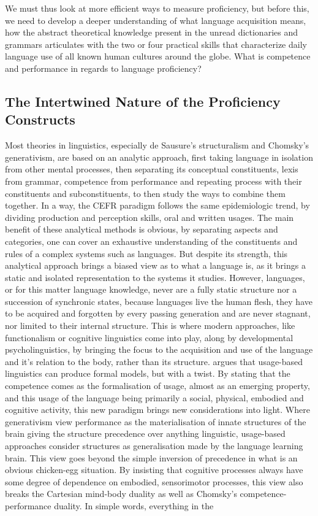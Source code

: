 We must thus look at more efficient ways to measure proficiency, but before this, we need to develop a deeper understanding of what language acquisition means, how the abstract theoretical knowledge present in the unread dictionaries and grammars articulates with the two or four practical skills that characterize daily language use of all known human cultures around the globe. What is competence and performance in regards to language proficiency?

    \subsection{The Intertwined Nature of the Proficiency Constructs}
Most theories in linguistics, especially de Sausure's structuralism and Chomsky's generativism, are based on an analytic approach, first taking language in isolation from other mental processes, then separating its conceptual constituents, lexis from grammar, competence from performance \parencite{chomsky_aspects_1965} and repeating process with their constituents and subconstituents, to then study the ways to combine them together. In a way, the CEFR paradigm follows the same epidemiologic trend, by dividing production and perception skills, oral and written usages. The main benefit of these analytical methods is obvious, by separating aspects and categories, one can cover an exhaustive understanding of the constituents and rules of a complex systems such as languages. But despite its strength, this analytical approach brings a biased view as to what a language is, as it brings a static and isolated representation to the systems it studies. However, languages, or for this matter language knowledge, never are a fully static structure nor a succession of synchronic states, because languages live the human flesh, they have to be acquired and forgotten by every passing generation and are never stagnant, nor limited to their internal structure. This is where modern approaches, like functionalism or cognitive linguistics \textcite{evans_cognitive_2009} come into play, along by developmental psycholinguistics, by bringing the focus to the acquisition and use of the language and it's relation to the body, rather than its structure. \textcite{bybee_usage-based_1999} argues that usage-based linguistics can produce formal models, but with a twist. By stating that the competence comes as the formalisation of usage, almost as an emerging property, and this usage of the language being primarily a social, physical, embodied and cognitive activity, this new paradigm brings new considerations into light. Where generativism view performance as the materialisation of innate structures of the brain giving the structure precedence over anything linguistic, usage-based approaches consider structures as generalisation made by the language learning brain. This view goes beyond the simple inversion of precedence in what is an obvious chicken-egg situation. By insisting that cognitive processes always have some degree of dependence on embodied, sensorimotor processes, this view also breaks the Cartesian mind-body duality \parencite{varela_embodied_1991} as well as Chomsky's competence-performance duality. In simple words, everything in the 